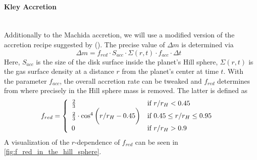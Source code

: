       \paragraph{Kley Accretion} \ \\
        Additionally to the Machida accretion, we will use a modified version 
        of the accretion recipe suggested by 
        \citeauthor{Kley_1999} (\citeyear{Kley_1999}). 
        The precise value of $\Delta m$ is determined via
        \begin{equation}
          \Delta m=f_{red}\cdot S_{acc}\cdot\Sigma(r,t)\cdot
          f_{acc}\cdot \Delta t
        \end{equation}
        Here, $S_{acc}$ is the size of the disk surface inside the planet's 
        Hill sphere, $\Sigma(r,t)$ is the gas surface density at a distance 
        $r$ from the planet's center at time $t$.
        With the parameter $f_{acc}$, the overall accretion rate can be tweaked
        and $f_{red}$ determines from where precisely in the Hill sphere 
        mass is removed. The latter is defined as
        \begin{equation}
          f_{red} =
          \left\{
          	\begin{array}{ll}
              \frac{2}{3} & \textnormal{if }r/r_H<0.45 \\
              \frac{2}{3}\cdot\cos^4\bigg(r/r_H-0.45\bigg)
                  & \textnormal{if } 0.45 \leq r/r_H\leq 0.95 \\
          		0 & \textnormal{if } r/r_H>0.9
          	\end{array}
          \right.
        \end{equation}
        A visualization of the $r$-dependence of $f_{red}$ can be seen in
        \autoref{fig:f_red_in_the_hill_sphere}.
        \\
        \\
        \\
        \\
        \\
